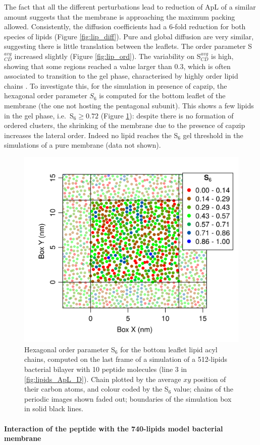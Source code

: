 The fact that all the different perturbations lead to reduction of ApL of a similar amount suggests that the membrane is approaching the maximum packing allowed.
%
Consistently, the diffusion coefficients had a 6-fold reduction for both species of lipids (Figure \ref{fig:lip_diff}). Pure and global diffusion are very similar, suggesting there is little translation between the leaflets.
%
The order parameter S$^{avg}_{CD}$ increased slightly (Figure \ref{fig:lip_ord}). The variability on S$^{avg}_{CD}$ is high, showing that some regions reached a value larger than 0.3, which is often associated to transition to the gel phase, characterised by highly order lipid chains \citep{Pluhackova2016}.
%
To investigate this, for the simulation in presence of capzip, the hexagonal order parameter $S_6$ is computed for the bottom leaflet of the membrane (the one not hosting the pentagonal subunit). This shows a few lipids in the gel phase, i.e.\ S$_6 \ge 0.72$ (Figure \ref{fig:S6_pb4}): despite there is no formation of ordered clusters, the shrinking of the membrane due to the presence of capzip increases the lateral order. Indeed no lipid reaches the S$_6$ gel threshold in the simulations of a pure membrane (data not shown).
%
\begin{figure}[h!]
\centering
\includegraphics[width=0.5\linewidth]{3results_capsule/pics/pb4_S6.png} 
\caption[Hexagonal order parameter of lipids in protein-lipid simulation]{Hexagonal order parameter S$_6$ for the bottom leaflet lipid acyl chains, computed on the last frame of a simulation of a 512-lipids bacterial bilayer with 10 peptide molecules (line 3 in \ref{fig:lipids_ApL_D}). Chain plotted by the average $xy$ position of their carbon atoms, and colour coded by the S$_6$ value; chains of the periodic images shown faded out; boundaries of the simulation box in solid black lines.}
\label{fig:S6_pb4}
\end{figure}

\paragraph{Interaction of the peptide with the 740-lipids model bacterial membrane}

